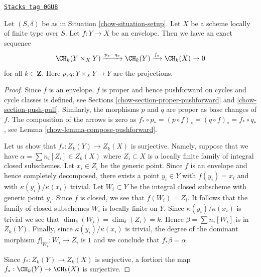 \begin{lemma}[Envelope]
\label{chow-lemma-envelope}
\href{https://stacks.math.columbia.edu/tag/0GU8}{\texttt{Stacks tag 0GU8}}

Let $(S, \delta)$ be as in Situation \ref{chow-situation-setup}.
Let $X$ be a scheme locally of finite type over $S$.
Let $f : Y \to X$ be an envelope. Then
we have an exact sequence
$$
\CH_k(Y \times_X Y) \xrightarrow{p_* - q_*}
\CH_k(Y) \xrightarrow{f_*}
\CH_k(X) \to 0
$$
for all $k \in \mathbf{Z}$. Here $p, q : Y \times_X Y \to Y$ are
the projections.
\end{lemma}

\begin{proof}

Since $f$ is an envelope, $f$ is proper and hence pushforward on
cycles and cycle classes is defined, see
Sections \ref{chow-section-proper-pushforward} and \ref{chow-section-push-pull}.
Similarly, the morphisms $p$ and $q$ are proper as base changes of $f$.
The composition of the arrows is zero as
$f_* \circ p_* = (p \circ f)_* = (q \circ f)_* = f_* \circ q_*$, see
Lemma \ref{chow-lemma-compose-pushforward}.

\medskip\noindent
Let us show that $f_* : Z_k(Y) \to Z_k(X)$ is surjective.
Namely, suppose that we have $\alpha = \sum n_i[Z_i] \in Z_k(X)$
where $Z_i \subset X$ is a locally finite family of integral
closed subschemes. Let $x_i \in Z_i$ be the generic point.
Since $f$ is an envelope and hence completely decomposed,
there exists a point $y_i \in Y$ with $f(y_i) = x_i$
and with $\kappa(y_i)/\kappa(x_i)$ trivial. Let $W_i \subset Y$
be the integral closed subscheme with generic point $y_i$.
Since $f$ is closed, we see that $f(W_i) = Z_i$.
It follows that the family of closed subschemes $W_i$ is locally finite
on $Y$. Since $\kappa(y_i)/\kappa(x_i)$ is trivial we see
that $\dim_\delta(W_i) = \dim_\delta(Z_i) = k$. Hence
$\beta = \sum n_i[W_i]$ is in $Z_k(Y)$. Finally, since
$\kappa(y_i)/\kappa(x_i)$ is trivial, the degree of the dominant
morphism $f|_{W_i} : W_i \to Z_i$ is $1$ and we conclude
that $f_*\beta = \alpha$.

\medskip\noindent
Since $f_* : Z_k(Y) \to Z_k(X)$ is surjective, a fortiori the map
$f_* : \CH_k(Y) \to \CH_k(X)$ is surjective.


\end{proof}
